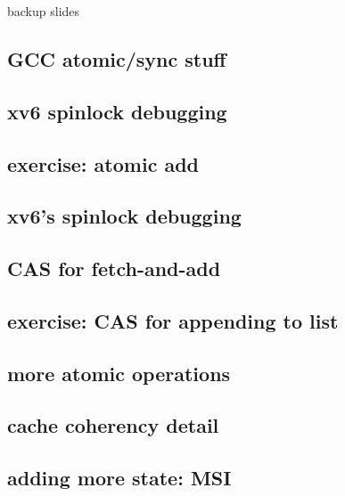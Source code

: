 \begin{frame}{backup slides}
\end{frame}


\subsection{GCC atomic/sync stuff}


\subsection{xv6 spinlock debugging}


\subsection{exercise: atomic add}


\subsection{xv6's spinlock debugging}



\subsection{CAS for fetch-and-add}


\subsection{exercise: CAS for appending to list}



\subsection{more atomic operations}



\subsection{cache coherency detail}
\subsection{adding more state: MSI}


